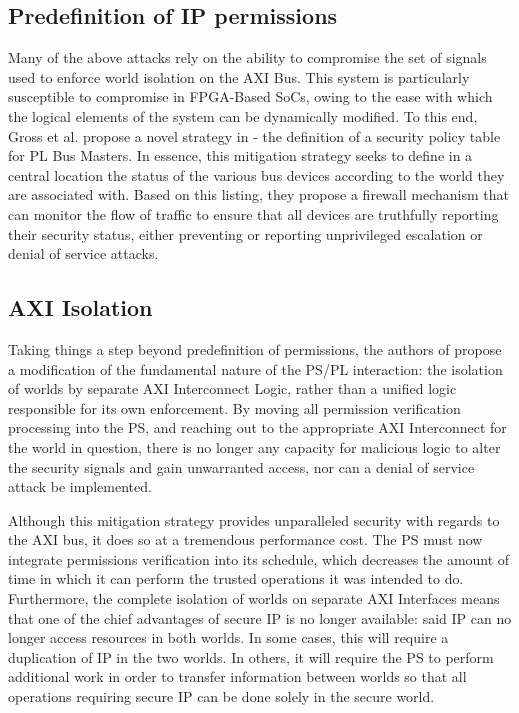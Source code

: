 \documentclass[journal]{IEEEtran}
\begin{document}
\subsection{Predefinition of IP permissions}
Many of the above attacks rely on the ability to compromise the set of signals used to
enforce world isolation on the AXI Bus. This system is particularly susceptible to
compromise in FPGA-Based SoCs, owing to the ease with which the logical elements of the
system can be dynamically modified. To this end, Gross et al. propose a novel strategy in
\cite{gross_breaking_2019} - the definition of a security policy table for PL Bus Masters.
In essence, this mitigation strategy seeks to define in a central location the status of
the various bus devices according to the world they are associated with. Based on this
listing, they propose a firewall mechanism that can monitor the flow of traffic to ensure
that all devices are truthfully reporting their security status, either preventing or 
reporting unprivileged escalation or denial of service attacks.

\subsection{AXI Isolation}
Taking things a step beyond predefinition of permissions, the authors of 
\cite{benhani_security_2017} propose a modification of the fundamental nature of the PS/PL
interaction: the isolation of worlds by separate AXI Interconnect Logic, rather than a 
unified logic responsible for its own enforcement. By moving all permission verification
processing into the PS, and reaching out to the appropriate AXI Interconnect for the world
in question, there is no longer any capacity for malicious logic to alter the security
signals and gain unwarranted access, nor can a denial of service attack be implemented.

Although this mitigation strategy provides unparalleled security with regards to the AXI
bus, it does so at a tremendous performance cost. The PS must now integrate permissions 
verification into its schedule, which decreases the amount of time in which it can perform
the trusted operations it was intended to do. Furthermore, the complete isolation of
worlds on separate AXI Interfaces means that one of the chief advantages of secure IP is
no longer available: said IP can no longer access resources in both worlds. In some cases,
this will require a duplication of IP in the two worlds. In others, it will require the PS
to perform additional work in order to transfer information between worlds so that all
operations requiring secure IP can be done solely in the secure world.
\end{document}
